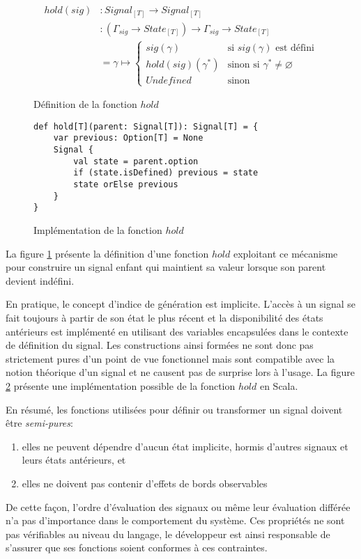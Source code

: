 	\begin{figure}
		\begin{align*}
			hold (sig) &\colon Signal_{[T]} \to Signal_{[T]} \\
			           &\colon (\Gamma_{sig} \to State_{[T]}) \to \Gamma_{sig} \to State_{[T]} \\
			           &= \gamma \mapsto \begin{cases}
			           		sig(\gamma) & \text{si } sig(\gamma) \text{ est défini} \\
			           		hold(sig)(\gamma^*) & \text{sinon si } \gamma^* \ne \varnothing \\
			           		Undefined & \text{sinon}
			           \end{cases}
		\end{align*}
		\caption{Définition de la fonction $hold$}
		\label{fig:sig-hold}
	\end{figure}

	\begin{figure}
		\begin{lstlisting}
def hold[T](parent: Signal[T]): Signal[T] = {
	var previous: Option[T] = None
	Signal {
		val state = parent.option
		if (state.isDefined) previous = state
		state orElse previous
	}
}
		\end{lstlisting}
		\caption{Implémentation de la fonction $hold$}
		\label{fig:sig-hold-scala}
	\end{figure}

	La figure \ref{fig:sig-hold} présente la définition d'une fonction $hold$ exploitant ce mécanisme pour construire un signal enfant qui maintient sa valeur lorsque son parent devient indéfini.
	
	En pratique, le concept d'indice de génération est implicite. L'accès à un signal se fait toujours à partir de son état le plus récent et la disponibilité des états antérieurs est implémenté en utilisant des variables encapsulées dans le contexte de définition du signal. Les constructions ainsi formées ne sont donc pas strictement pures d'un point de vue fonctionnel mais sont compatible avec la notion théorique d'un signal et ne causent pas de surprise lors à l'usage. La figure \ref{fig:sig-hold-scala} présente une implémentation possible de la fonction $hold$ en Scala.
	
	En résumé, les fonctions utilisées pour définir ou transformer un signal doivent être \emph{semi-pures}:
	\begin{enumerate}
		\item elles ne peuvent dépendre d'aucun état implicite, hormis d'autres signaux et leurs états antérieurs, et
		\item elles ne doivent pas contenir d'effets de bords observables
	\end{enumerate}
	De cette façon, l'ordre d'évaluation des signaux ou même leur évaluation différée n'a pas d'importance dans le comportement du système. Ces propriétés ne sont pas vérifiables au niveau du langage, le développeur est ainsi responsable de s'assurer que ses fonctions soient conformes à ces contraintes.
	
